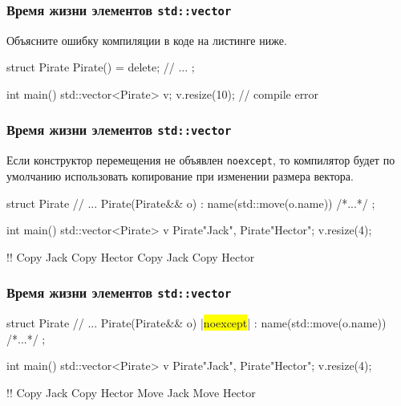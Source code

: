 \documentclass[compress, 8pt, aspectratio=169]{beamer}
\begin{document}
  \begin{frame}[fragile]

    \frametitle{Время жизни элементов \texttt{std::vector}}

    \begin{task}
      Объясните ошибку компиляции в коде на листинге ниже.
    \end{task}

    \begin{mycppinplacelisting}
struct Pirate {
    Pirate() = delete;
    // ...
};

int main() {
    std::vector<Pirate> v;
    v.resize(10); // compile error
}
    \end{mycppinplacelisting}

  \end{frame}

  \begin{frame}[fragile]

    \frametitle{Время жизни элементов \texttt{std::vector}}

    Если конструктор перемещения не объявлен \texttt{noexcept},
    то компилятор будет по умолчанию использовать копирование
    при изменении размера вектора.

    \begin{mycppinplacelisting}
struct Pirate {
    // ...
    Pirate(Pirate&& o) : name(std::move(o.name)) {/*...*/}
};

int main() {
    std::vector<Pirate> v {Pirate{"Jack"}, Pirate{"Hector"}};
    v.resize(4);
}
    \end{mycppinplacelisting}

    \begin{terminalwindow}
!!
Copy Jack
Copy Hector
Copy Jack
Copy Hector
    \end{terminalwindow}

  \end{frame}

  \begin{frame}[fragile]

    \frametitle{Время жизни элементов \texttt{std::vector}}

    \begin{mycppinplacelisting}
struct Pirate {
    // ...
    Pirate(Pirate&& o) |\colorbox{yellow}{noexcept}| : name(std::move(o.name))
    {/*...*/}
};

int main() {
    std::vector<Pirate> v {Pirate{"Jack"}, Pirate{"Hector"}};
    v.resize(4);
}
    \end{mycppinplacelisting}

    \begin{terminalwindow}
!!
Copy Jack
Copy Hector
Move Jack
Move Hector
    \end{terminalwindow}

  \end{frame}
\end{document}
